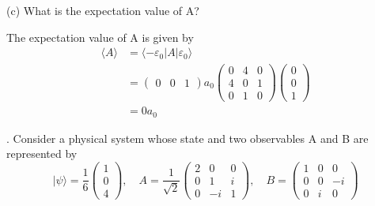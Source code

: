 \documentclass[a4paper, 11pt]{article}
\newcommand{\ket}[1]{|#1\rangle}
\newcommand{\bra}[1]{\langle #1 |}
\newcommand{\expect}[1]{\langle #1 \rangle}
\newenvironment{solution}{%
	\begin{list}{}{%
			\setlength{\topsep}{0pt}%
			\setlength{\leftmargin}{1.5cm}%
			\setlength{\rightmargin}{1.5cm}%
			\setlength{\listparindent}{\parindent}%
			\setlength{\itemindent}{\parindent}%
			\setlength{\parsep}{\parskip}%
		}%
		\item[]}{\end{list}}
\begin{document}
\noindent(c) What is the expectation value of A? 
	\begin{solution}
		The expectation value of A is given by 
			\begin{align*}
				\expect{A} &= \bra{-\varepsilon_0}A\ket{\varepsilon_0} \\ 
					&= \begin{pmatrix}0 & 0 & 1\end{pmatrix}a_0\begin{pmatrix}0 & 4 & 0 \\ 4 & 0 & 1 \\ 0 & 1 & 0\end{pmatrix}\begin{pmatrix}0 \\ 0 \\ 1\end{pmatrix}\\
					&= 0a_0
			\end{align*}
	\end{solution}

. Consider a physical system whose state and two observables A and B are represented by
	\begin{equation*}
		\ket{\psi} = \frac{1}{6}\begin{pmatrix}1\\0\\4\end{pmatrix}, \quad A=\frac{1}{\sqrt{2}}\begin{pmatrix}
		2 & 0 & 0 \\ 
		0 & 1 & i \\ 
		0 & -i & 1
		\end{pmatrix}, \quad B = \begin{pmatrix}
		1 & 0 & 0 \\ 
		0 & 0 & -i \\ 
		0 & i & 0
		\end{pmatrix}
	\end{equation*} 
\end{document}
